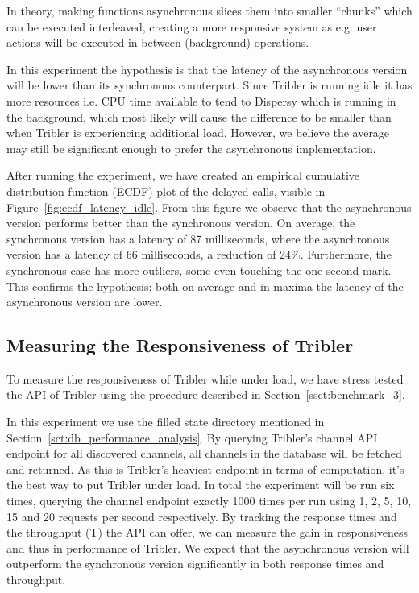 In theory, making functions asynchronous slices them into smaller \enquote{chunks} which can be executed interleaved, creating a more responsive system as e.g. user actions will be executed in between (background) operations.

In this experiment the hypothesis is that the latency of the asynchronous version will be lower than its synchronous counterpart.
Since Tribler is running idle it has more resources i.e. CPU time available to tend to Dispersy which is running in the background, which most likely will cause the difference to be smaller than when Tribler is experiencing additional load.
However, we believe the average may still be significant enough to prefer the asynchronous implementation.

After running the experiment, we have created an empirical cumulative distribution function (ECDF) plot of the delayed calls, visible in Figure~\ref{fig:ecdf_latency_idle}.
From this figure we observe that the asynchronous version performs better than the synchronous version.
On average, the synchronous version has a latency of 87 milliseconds, where the asynchronous version has a latency of 66 milliseconds, a reduction of 24\%.
Furthermore, the synchronous case has more outliers, some even touching the one second mark.
This confirms the hypothesis: both on average and in maxima the latency of the asynchronous version are lower.

\subsection{Measuring the Responsiveness of Tribler}
\label{sct:measuring_responsiveness_tribler}

To measure the responsiveness of Tribler while under load, we have stress tested the API of Tribler using the procedure described in Section~\ref{ssct:benchmark_3}.

In this experiment we use the filled state directory mentioned in Section~\ref{sct:db_performance_analysis}.
By querying Tribler's channel API endpoint for all discovered channels, all channels in the database will be fetched and returned.
As this is Tribler's heaviest endpoint in terms of computation, it's the best way to put Tribler under load.
In total the experiment will be run six times, querying the channel endpoint exactly 1000 times per run using 1, 2, 5, 10, 15 and 20 requests per second respectively.
By tracking the response times and the throughput (T) the API can offer, we can measure the gain in responsiveness and thus in performance of Tribler.
We expect that the asynchronous version will outperform the synchronous version significantly in both response times and throughput.

